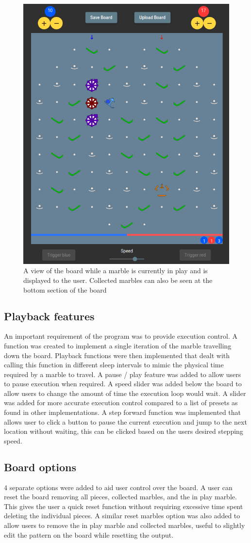 \documentclass{l4proj}
\begin{document}
\begin{figure}
    \centering
    \includegraphics[width=0.5\linewidth]{images/marbleInPlay.png}
    \caption{A view of the board while a marble is currently in play and is displayed to the user. Collected marbles can also be seen at the bottom section of the board}
    \label{fig:marbleInPlay}
\end{figure}

\subsection{Playback features}
An important requirement of the program was to provide execution control. A function was created to implement a single iteration of the marble travelling down the board. Playback functions were then implemented that dealt with calling this function in different sleep intervals to mimic the physical time required by a marble to travel. A pause / play feature was added to allow users to pause execution when required. A speed slider was added below the board to allow users to change the amount of time the execution loop would wait. A slider was added for more accurate execution control compared to a list of presets as found in other implementations. A step forward function was implemented that allows user to click a button to pause the current execution and jump to the next location without waiting, this can be clicked based on the users desired stepping speed. 

\subsection{Board options}
4 separate options were added to aid user control over the board. A user can reset the board removing all pieces, collected marbles, and the in play marble. This gives the user a quick reset function without requiring excessive time spent deleting the individual pieces. A similar reset marbles option was also added to allow users to remove the in play marble and collected marbles, useful to slightly edit the pattern on the board while resetting the output.
\end{document}
